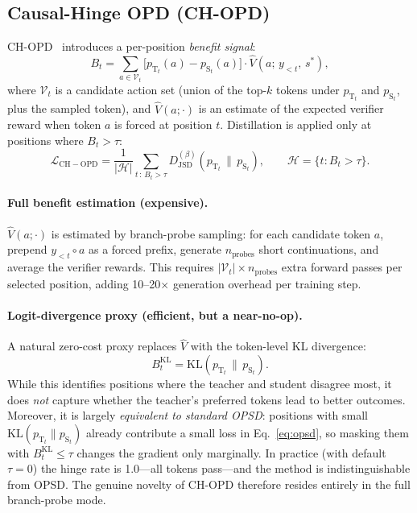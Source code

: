 \documentclass[11pt]{article}
\newcommand{\pT}{p_{\mathrm{T}}}
\newcommand{\pS}{p_{\mathrm{S}}}
\newcommand{\KL}{\mathrm{KL}}
\newcommand{\JSD}{\mathrm{JSD}}
\begin{document}
\subsection{Causal-Hinge OPD (CH-OPD)}

CH-OPD~\cite{ch-opd} introduces a per-position \emph{benefit signal}:
\begin{equation}
  B_t = \sum_{a \in \mathcal{V}_t}
        \bigl[\pT_t(a) - \pS_t(a)\bigr] \cdot \hat{V}(a;\, y_{<t},\, s^*),
  \label{eq:benefit}
\end{equation}
where $\mathcal{V}_t$ is a candidate action set (union of the top-$k$ tokens under $\pT_t$
and $\pS_t$, plus the sampled token), and $\hat{V}(a;\cdot)$ is an estimate of the expected
verifier reward when token $a$ is forced at position $t$.  Distillation is applied only at
positions where $B_t > \tau$:
\begin{equation}
  \mathcal{L}_{\mathrm{CH-OPD}}
  = \frac{1}{|\mathcal{H}|}\sum_{t\,:\,B_t>\tau}
    D_{\JSD}^{(\beta)}\!\left(\pT_t \,\|\, \pS_t\right),
  \qquad \mathcal{H} = \{t : B_t > \tau\}.
\end{equation}

\paragraph{Full benefit estimation (expensive).}
$\hat{V}(a;\cdot)$ is estimated by branch-probe sampling: for each candidate token $a$,
prepend $y_{<t} \circ a$ as a forced prefix, generate $n_{\text{probes}}$ short
continuations, and average the verifier rewards.  This requires $|\mathcal{V}_t| \times
n_{\text{probes}}$ extra forward passes per selected position, adding 10--20$\times$
generation overhead per training step.

\paragraph{Logit-divergence proxy (efficient, but a near-no-op).}
A natural zero-cost proxy replaces $\hat{V}$ with the token-level KL divergence:
\begin{equation}
  B_t^{\mathrm{KL}} = \KL\!\left(\pT_t \,\|\, \pS_t\right).
  \label{eq:kl-proxy}
\end{equation}
While this identifies positions where the teacher and student disagree most, it does
\emph{not} capture whether the teacher's preferred tokens lead to better outcomes.
Moreover, it is largely \emph{equivalent to standard OPSD}: positions with small
$\KL(\pT_t\|\pS_t)$ already contribute a small loss in Eq.~\eqref{eq:opsd}, so masking
them with $B_t^{\mathrm{KL}} \leq \tau$ changes the gradient only marginally.  In practice
(with default $\tau=0$) the hinge rate is 1.0—all tokens pass—and the method is
indistinguishable from OPSD.  The genuine novelty of CH-OPD therefore resides entirely in
the full branch-probe mode.
\end{document}
